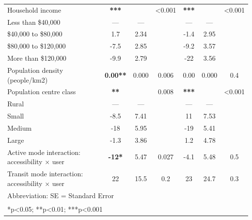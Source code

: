 \documentclass[preprint, 3p,
authoryear]{elsarticle} %
\begin{document}
\begin{table}
\begin{tabular}[t]{lcccccc}
\addlinespace
Household income & \textbf{***} &  & <0.001 & \textbf{***} &  & <0.001\\
\hspace{1em}Less than \$40,000 & — & — &  & — & — & \\
\hspace{1em}\$40,000 to \$80,000 & 1.7 & 2.34 &  & -1.4 & 2.95 & \\
\hspace{1em}\$80,000 to \$120,000 & -7.5 & 2.85 &  & -9.2 & 3.57 & \\
\hspace{1em}More than \$120,000 & -9.9 & 2.79 &  & -22 & 3.56 & \\
\addlinespace
Population density (people/km2) & \textbf{0.00**} & 0.000 & 0.006 & 0.00 & 0.000 & 0.4\\
Population centre class & \textbf{**} &  & 0.008 & \textbf{***} &  & <0.001\\
\hspace{1em}Rural & — & — &  & — & — & \\
\hspace{1em}Small & -8.5 & 7.41 &  & 11 & 7.53 & \\
\hspace{1em}Medium & -18 & 5.95 &  & -19 & 5.41 & \\
\addlinespace
\hspace{1em}Large & -1.3 & 3.86 &  & 1.2 & 4.78 & \\
Active mode interaction: accessibility × user & \textbf{-12*} & 5.47 & 0.027 & -4.1 & 5.48 & 0.5\\
Transit mode interaction: accessibility × user & 22 & 15.5 & 0.2 & 23 & 24.7 & 0.3\\
\bottomrule
\multicolumn{7}{l}{\rule{0pt}{1em}Abbreviation: SE = Standard Error}\\
\multicolumn{7}{l}{\textsuperscript{} *p<0.05; **p<0.01; ***p<0.001}\\
\end{tabular}
\end{table}

\renewcommand{\thetable}{A.4}
\end{document}
